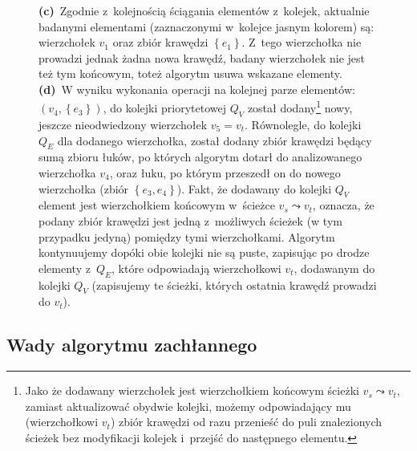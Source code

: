 \begin{savenotes}
\begin{figure}[!h]
{			\textbf{(c)}~Zgodnie z~kolejnością ściągania elementów z~kolejek, aktualnie badanymi elementami (zaznaczonymi w~kolejce jasnym kolorem) są: wierzchołek $v_{1}$ oraz zbiór krawędzi $\left\{ e_{1} \right\}$. Z~tego wierzchołka nie prowadzi jednak żadna nowa krawędź, badany wierzchołek nie jest też tym końcowym, toteż algorytm usuwa wskazane elementy.
			\textbf{(d)}~W wyniku wykonania operacji na kolejnej parze elementów: $\left( v_{4}, \left\{ e_{3} \right\} \right)$, do kolejki priorytetowej $Q_{V}$ został dodany\footnote{Jako że dodawany wierzchołek jest wierzchołkiem końcowym ścieżki $v_{s} \leadsto v_{t}$, zamiast aktualizować obydwie kolejki, możemy odpowiadający mu (wierzchołkowi $v_{t}$) zbiór krawędzi od razu przenieść do puli znalezionych ścieżek bez modyfikacji kolejek i~przejść do następnego elementu.} nowy, jeszcze nieodwiedzony wierzchołek $v_{5} = v_{t}$. Równolegle, do kolejki $Q_{E}$ dla dodanego wierzchołka, został dodany zbiór krawędzi będący sumą zbioru łuków, po których algorytm dotarł do analizowanego wierzchołka $v_{4}$, oraz łuku, po którym przeszedł on do nowego wierzchołka (zbiór $\left\{ e_{3}, e_{4} \right\}$). Fakt, że dodawany do kolejki $Q_{V}$ element jest wierzchołkiem końcowym w~ścieżce $v_{s} \leadsto v_{t}$, oznacza, że podany zbiór krawędzi jest jedną z~możliwych ścieżek (w tym przypadku jedyną) pomiędzy tymi wierzchołkami. Algorytm kontynuujemy dopóki obie kolejki nie są puste, zapisując po drodze elementy z~$Q_{E}$, które odpowiadają wierzchołkowi $v_{t}$, dodawanym do kolejki $Q_{V}$ (zapisujemy te ścieżki, których ostatnia krawędź prowadzi do $v_{t}$).
		}
		\label{fig:bfsExample}
	\end{figure}
\end{savenotes}

\subsection{Wady algorytmu zachłannego}

